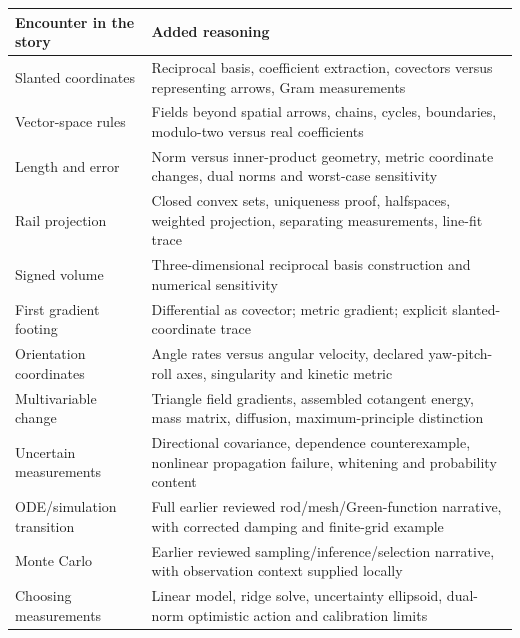 {\def\LTcaptype{none} %
\begin{longtable}[]{@{}
  >{\raggedright\arraybackslash}p{}
  >{\raggedright\arraybackslash}p{}@{}}
\toprule\noalign{}
\begin{minipage}[b]{\linewidth}\raggedright
Encounter in the story
\end{minipage} & \begin{minipage}[b]{\linewidth}\raggedright
Added reasoning
\end{minipage} \\
\midrule\noalign{}
\endhead
\bottomrule\noalign{}
\endlastfoot
Slanted coordinates & Reciprocal basis, coefficient extraction, covectors versus representing arrows, Gram measurements \\
Vector-space rules & Fields beyond spatial arrows, chains, cycles, boundaries, modulo-two versus real coefficients \\
Length and error & Norm versus inner-product geometry, metric coordinate changes, dual norms and worst-case sensitivity \\
Rail projection & Closed convex sets, uniqueness proof, halfspaces, weighted projection, separating measurements, line-fit trace \\
Signed volume & Three-dimensional reciprocal basis construction and numerical sensitivity \\
First gradient footing & Differential as covector; metric gradient; explicit slanted-coordinate trace \\
Orientation coordinates & Angle rates versus angular velocity, declared yaw-pitch-roll axes, singularity and kinetic metric \\
Multivariable change & Triangle field gradients, assembled cotangent energy, mass matrix, diffusion, maximum-principle distinction \\
Uncertain measurements & Directional covariance, dependence counterexample, nonlinear propagation failure, whitening and probability content \\
ODE/simulation transition & Full earlier reviewed rod/mesh/Green-function narrative, with corrected damping and finite-grid example \\
Monte Carlo & Earlier reviewed sampling/inference/selection narrative, with observation context supplied locally \\
Choosing measurements & Linear model, ridge solve, uncertainty ellipsoid, dual-norm optimistic action and calibration limits \\
\end{longtable}
}

